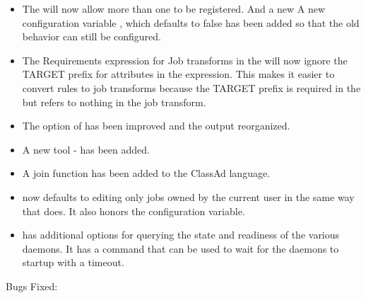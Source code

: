 \begin{itemize}
\item The  will now allow more than one  to be registered.
And a new A new configuration variable , which defaults
to false has been added so that the old behavior can still be configured.

\item The Requirements expression for Job transforms in the  will now ignore the TARGET
prefix for attributes in the expression. This makes it easier to convert  rules
to job transforms because the TARGET prefix is required in the  but refers to nothing
in the job transform.

\item The  option of  has been improved and the output reorganized.

\item A new tool -  has been added.

\item A join function has been added to the ClassAd language.

\item {} now defaults to editing only jobs owned by the current user in the same way that
 does. It also honors the  configuration variable.

\item {} has additional options for querying the state and readiness of the various daemons.
It has a command that can be used to wait for the daemons to startup with a timeout.

\end{itemize}

\noindent Bugs Fixed:

